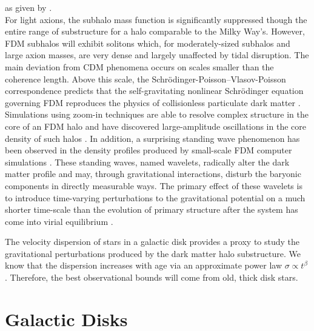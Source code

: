 \documentclass[usenatbib]{mnras}
\begin{document}
as given by \citet{axion_cosmology}. \\ For light axions, the subhalo mass function is significantly suppressed though the entire range of substructure for a halo comparable to the Milky Way’s. However, FDM subhalos will exhibit solitons which, for moderately-sized subhalos and large axion masses, are very dense and largely unaffected by tidal disruption. The main deviation from CDM phenomena occurs on scales smaller than the coherence length. Above this scale, the Schr\"{o}dinger-Poisson–Vlasov-Poisson correspondence predicts that the self-gravitating nonlinear Schr\"{o}dinger equation governing FDM reproduces the physics of collisionless particulate dark matter \citep{Schrodinger-Poisson}. Simulations using zoom-in techniques are able to resolve complex structure in the core of an FDM halo and have discovered large-amplitude oscillations in the core density of such halos \citep{structure-FDM-halos}. In addition, a surprising standing wave phenomenon has been observed in the density profiles produced by small-scale FDM computer simulations \citep{cold_and_fuzzy}. These standing waves, named wavelets, radically alter the dark matter profile and may, through gravitational interactions, disturb the baryonic components in directly measurable ways. The primary effect of these wavelets is to introduce time-varying perturbations to the gravitational potential on a much shorter time-scale than the evolution of primary structure after the system has come into virial equilibrium \citep{Schrodinger-Poisson}. 
\par
	The velocity dispersion of stars in a galactic disk provides a proxy to study the gravitational perturbations produced by the dark matter halo substructure. We know that the dispersion increases with age via an approximate power law $\sigma \propto t^\beta$ \citep{heating_history}. Therefore, the best observational bounds will come from old, thick disk stars.  

\section{Galactic Disks}
\end{document}
